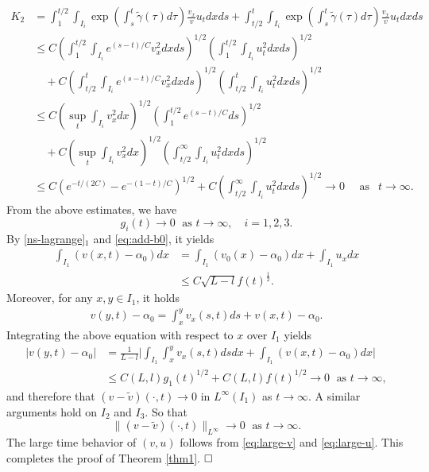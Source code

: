\documentclass[a4paper,oneside,11pt]{article}
\numberwithin{equation}{section}
\begin{document}
\begin{align*}
\displaystyle  K_2  &= \int_{1}^{t/2}\int_{I_i}\exp \left( {\int_{s}^{t}\tilde{\gamma}(\tau) {d\tau }}\right)\frac{v_x}{v}{u}_{t}{dxds}+\int_{t/2}^{t}\int_{I_i}\exp \left( {\int_{s}^{t}\tilde{\gamma}(\tau) {d\tau }}\right)\frac{v_x}{v}{u}_{t}{dxds}\\
&\leq C\left(\int_{1}^{t/2}\int_{I_i}e^{(s-t)/C}v_x^2{dxds}\right)^{1/2}\left(\int_{1}^{t/2}\int_{I_i}u_t^2{dxds}\right)^{1/2}\\&\quad+
C\left(\int_{t/2}^{t}\int_{I_i}e^{(s-t)/C}v_x^2{dxds}\right)^{1/2}\left(\int_{t/2}^{t}\int_{I_i}u_t^2{dxds}\right)^{1/2}\\
&\leq C\left(\sup_{t}\int_{I_i}v_x^2dx\right)^{1/2}\left(\int_{1}^{t/2}e^{(s-t)/C}ds\right)^{1/2}\\&\quad+
C\left(\sup_{t}\int_{I_i}v_x^2dx\right)^{1/2}\left(\int_{t/2}^{\infty}\int_{I_i}u_t^2{dxds}\right)^{1/2}\\
&\leq C\left(e^{-t/(2C)}-e^{-(1-t)/C}\right)^{1/2}+C\left(\int_{t/2}^{\infty}\int_{I_i}u_t^2{dxds}\right)^{1/2}\rightarrow  0\quad \text{ as }~~ t \rightarrow  \infty.
\end{align*}
From the above estimates, we have 
\begin{equation}\label{eq:large-g}
g_i(t) \rightarrow  0\;\text{ as }t \rightarrow  \infty,\quad i=1,2,3. 
\end{equation}
By \eqref{ns-lagrange}$_1$ and \eqref{eq:add-b0}, it yields
\begin{align*}
\displaystyle  \int_{I_1} (v(x,t)-\alpha_0)dx&=\int_{I_1} (v_0(x)-\alpha_0)dx+\int_{I_1}u_xdx\\
&\leq C\sqrt{L-l}f(t)^{\frac12}.%
\end{align*}
Moreover, for any $x,y\in I_1$, it holds
\begin{align*}
\displaystyle  v(y,t)-\alpha_0%
=\int_x^y v_x(s,t)ds+v(x,t)-\alpha_0.
\end{align*}
Integrating the above equation with respect to $x$ over $I_1$ yields
\begin{align*}
\displaystyle  |v(y,t)-\alpha_0|&=\frac{1}{L-l}\Big|\int_{I_1}\int_x^y v_x(s,t)dsdx+\int_{I_1}(v(x,t)-\alpha_0)dx\Big|\\
&\leq C(L,l)g_1(t)^{1/2}+C(L,l)f(t)^{1/2}\rightarrow  0\;\text{ as }t \rightarrow  \infty,
\end{align*}
and therefore that $(v-\tilde{v})(\cdot,t) \rightarrow  0$ in $L^\infty(I_1)$ as $t \rightarrow  \infty$. A similar arguments hold on $I_2$ and $I_3$.
So that 
\begin{equation}\label{eq:large-v}
\| (v-\tilde{v})(\cdot ,t) \|_{{L}^{\infty }}\rightarrow  0\;\text{ as }t \rightarrow  \infty .
\end{equation}
The large time behavior of $(v,u)$ follows from \eqref{eq:large-v} and \eqref{eq:large-u}.
This completes the proof of Theorem \ref{thm1}. $\hfill\square$
\end{document}
